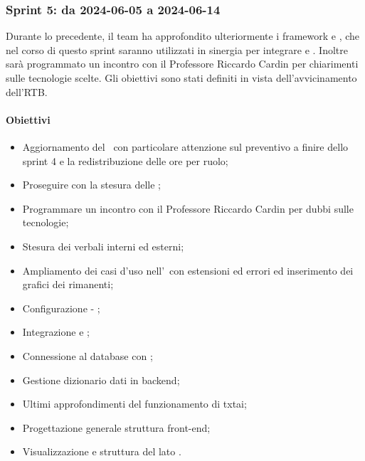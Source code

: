 \subsubsection{Sprint 5: da 2024-06-05 a 2024-06-14}
Durante lo  precedente, il team ha approfondito ulteriormente i framework  e , che nel corso di questo sprint saranno utilizzati in sinergia per integrare  e .
Inoltre sarà programmato un incontro con il Professore Riccardo Cardin per chiarimenti sulle tecnologie scelte. Gli obiettivi sono stati definiti in vista dell'avvicinamento dell'RTB. 


\paragraph{Obiettivi}
\begin{itemize}
  \item Aggiornamento del \PdP\ con particolare attenzione sul preventivo a finire dello sprint 4 e la redistribuzione delle ore per ruolo;
  \item Proseguire con la stesura delle \NdP;
  \item Programmare un incontro con il Professore Riccardo Cardin per dubbi sulle tecnologie;
  \item Stesura dei verbali interni ed esterni;
  \item Ampliamento dei casi d'uso nell'\AdR\ con estensioni ed errori ed inserimento dei grafici dei  rimanenti;
  \item Configurazione  - ;
  \item Integrazione  e ;
  \item Connessione al database con ;
  \item Gestione  dizionario dati in backend;
  \item Ultimi approfondimenti del funzionamento di txtai;
  \item Progettazione generale struttura front-end;
  \item Visualizzazione  e struttura del  lato .
\end{itemize}

\vspace{0.5\baselineskip}
\par [Inserire Gantt]